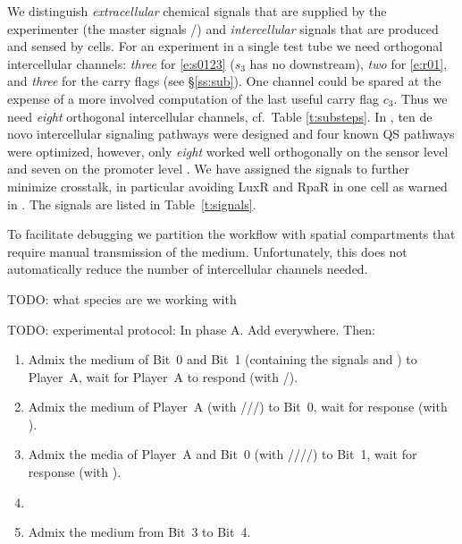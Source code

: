 \documentclass[12pt,notitlepage]{article}
\newcommand{\TODO}[1]{\textrm{\color{red}TODO: #1}}
\newcommand{\ra}[1]{{\color{Blue}#1}}
\begin{document}
We distinguish
\emph{extracellular} chemical signals 
that are supplied by the experimenter
(the master signals /)
and
\emph{intercellular} signals
that are produced and sensed by cells.
%
%
%
For an experiment in a single test tube 
we need
orthogonal intercellular channels:
\emph{three} for \eqref{e:s0123}
($s_3$ has no downstream),
\emph{two} for \eqref{e:r01},
and
\emph{three} for the carry flags
(see \S\ref{ss:sub}).
%
One channel could be spared 
at the expense
of a more involved computation of 
the last useful carry flag $c_3$.
%
Thus we need \emph{eight} orthogonal intercellular channels,
cf.~Table \ref{t:substeps}.
%
In \cite{DuETAL2020},
ten de novo intercellular signaling pathways
were designed
and
four known QS pathways
were optimized,
however,
only \emph{eight} worked well orthogonally
on the sensor level 
and 
seven on the promoter level
\cite[\href{https://www.nature.com/articles/s41467-020-17993-w/figures/3}{Fig.~3c/g}]{DuETAL2020}.
%
We have assigned the signals
to further minimize crosstalk,
in particular 
avoiding LuxR and RpaR in one cell
as warned in \cite[p.6]{DuETAL2020}.
%
The signals are listed in
Table~\ref{t:signals}.
%
%
%




%

\ra{
To facilitate debugging
we partition the workflow
with spatial compartments
that require manual transmission of 
the medium.
%
%
Unfortunately, this does not automatically reduce
the number of intercellular channels needed.
}


\TODO{what species are we working with}


\TODO{experimental protocol:}
%
In phase A.
%
Add  everywhere.
%
Then:
%
\begin{enumerate}
\item 
    Admix the medium of Bit~0 and Bit~1 
    (containing the signals  and )
    to Player~A,
    wait for Player~A to respond
    (with /).
    
\item
    Admix the medium of Player~A
    (with ///)
    to Bit~0, wait for response
    (with ).
    
\item
    Admix the media of Player~A and Bit~0
    (with ////)
    to Bit~1, wait for response
    (with ). 
    
\item
    
\item
    Admix the medium from Bit~3 to Bit~4.
    
\end{enumerate}
\end{document}
